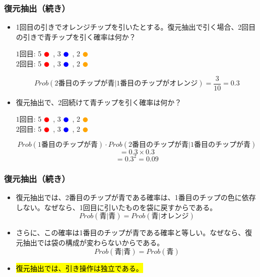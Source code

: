 \begin{frame}
\frametitle{復元抽出（続き）}

\begin{itemize}

\item 1回目の引きでオレンジチップを引いたとする。復元抽出で引く場合、2回目の引きで青チップを引く確率は何か？

\begin{center}
$1\text{回目}$: 5 \textcolor{red}{$\CIRCLE$}~, 3 \textcolor{blue}{$\CIRCLE$}~, 2 \textcolor{orange}{$\CIRCLE$} \\
$2\text{回目}$: 5 \textcolor{red}{$\CIRCLE$}~, 3 \textcolor{blue}{$\CIRCLE$}~, 2 \textcolor{orange}{$\CIRCLE$}
\end{center}
\[ Prob(2\text{番目のチップが青} | 1\text{番目のチップがオレンジ}) = \frac{3}{10} = 0.3 \]

\item 復元抽出で、2回続けて青チップを引く確率は何か？
\begin{center}

$1\text{回目}$: 5 \textcolor{red}{$\CIRCLE$}~, 3 \textcolor{blue}{$\CIRCLE$}~, 2 \textcolor{orange}{$\CIRCLE$} \\
$2\text{回目}$: 5 \textcolor{red}{$\CIRCLE$}~, 3 \textcolor{blue}{$\CIRCLE$}~, 2 \textcolor{orange}{$\CIRCLE$}
\end{center}
\footnotesize
\[ Prob(1\text{番目のチップが青}) \cdot Prob(2\text{番目のチップが青} | 1\text{番目のチップが青}) \]
\[ = 0.3 \times 0.3 \]
\[ = 0.3^2 = 0.09 \]

\end{itemize}

\end{frame}


\begin{frame}[shrink=20]
\frametitle{復元抽出（続き）}

\begin{itemize}

\item 復元抽出では、2番目のチップが青である確率は、1番目のチップの色に依存しない。なぜなら、1回目に引いたものを袋に戻すからである。
\[ Prob(\text{青} | \text{青}) = Prob(\text{青} | \text{オレンジ}) \]

\item さらに、この確率は1番目のチップが青である確率と等しい。なぜなら、復元抽出では袋の構成が変わらないからである。
\[ Prob(\text{青} | \text{青}) = Prob(\text{青}) \]

\item \hl{復元抽出では、引き操作は独立である。}

\end{itemize}

\end{frame}


